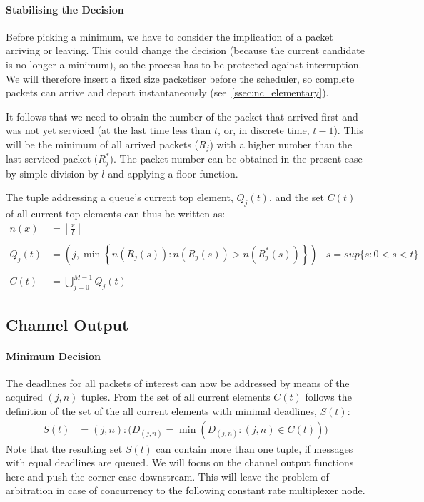 \paragraph{Stabilising the Decision}
Before picking a minimum, we have to consider the implication of a packet arriving or leaving.
This could change the decision (because the current candidate is no longer a minimum),
so the process has to be protected against interruption. We will therefore insert a fixed size packetiser
before the scheduler, so complete packets can arrive and depart instantaneously (see~\ref{ssec:nc_elementary}).
\par
It follows that we need to obtain the number of the packet that arrived first and was not yet serviced (at the last time less than $t$,
or, in discrete time, $t-1$).
This will be the minimum of all arrived packets ($R_j$) with a higher number than the last serviced packet ($R_j^*$).
The packet number can be obtained in the present case by simple division by $l$ and applying a floor function.
\par
The tuple addressing a queue's current top element, $Q_j(t)$, and the set $C(t)$ of all current top elements can thus be written as:
\begin{equation}
\begin{aligned}
n(x) &=  \left \lfloor \frac{x}{l} \right \rfloor\\
\\
Q_j(t) &=  \left(j, \min \left\{ n(R_j(s)) : n(R_j(s)) > n(R_j^*(s))  \right\} \right) & s = sup\{s : 0 < s < t\}\\
\\
C(t) &= \bigcup\limits_{j=0}^{M-1} Q_j(t)&
\label{eq:q_tops}
\end{aligned}
\end{equation}

\subsection{Channel Output}

\paragraph{Minimum Decision}
The deadlines for all packets of interest can now be addressed by means of the acquired $(j,n)$ tuples.
From the set of all current elements $C(t)$ follows the definition of the set of the all current elements with minimal deadlines, $S(t)$:
%
\begin{equation}
\begin{aligned}
S(t) &= (j,n) : \big( D_{(j,n)} = \min (D_{(j,n)} : (j,n) \in C(t) )\big)
\label{eq:ch_min_d}
\end{aligned}
\end{equation}
%
Note that the resulting set $S(t)$ can contain more than one tuple, if messages with equal deadlines are queued.
We will focus on the channel output functions here and push the corner case downstream.
This will leave the problem of arbitration in case of concurrency to the following constant rate multiplexer node.
